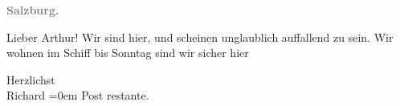 \pstart
           \centering{}\textcolor{gray}{\textbf{Salzburg.}}\pend
           
\pstart{}Lieber Arthur!\pend\vspace{0.5em}
\pstart
           Wir sind hier, und scheinen unglaublich auffallend zu sein. Wir wohnen im Schiff bis Sonntag sind wir sicher
               hier\pend
           
\pstart
           Herzlichst{\\[\baselineskip]}\spacefill\mbox{Richard}\pend
           \leftskip=0em{}
\pstart
           \noindent{}Post restante.\pend
           \endnumbering{}  \newcommand{\dateiname}{L00554}\newcommand{\titel}{Richard Beer-Hofmann an Arthur Schnitzler, 26. 6. 1896}\newcommand{\editorInnen}{Martin Anton Müller und Gerd-Hermann Susen}
